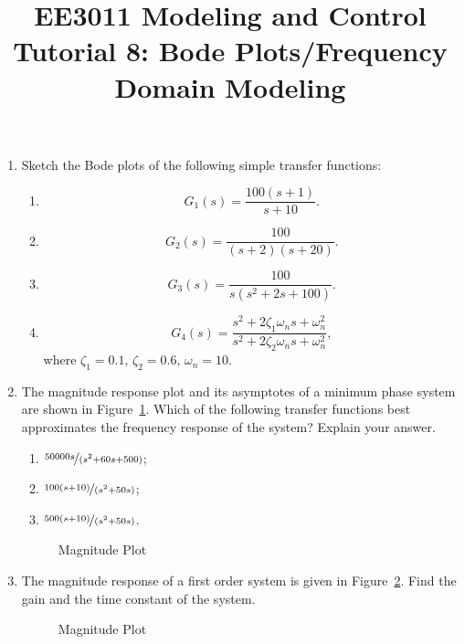 \documentclass{article}
\title{EE3011 Modeling and Control\\Tutorial 8: Bode Plots/Frequency Domain Modeling}
\date{}
\newcommand{\tikzdir}[1]{tikz/#1.tikz}
\newcommand{\inputtikz}[1]{}}
\begin{document}
 \maketitle

\begin{enumerate}
\item Sketch the Bode plots of the following simple transfer functions:
  \begin{enumerate}
  \item  \[G_1(s)=\frac{100(s+1)}{s+10}.\]
  \item  \[G_2(s)=\frac{100}{(s+2)(s+20)}.\]
  \item  \[G_3(s) = \frac{100}{s(s^2+2s+100)}.\]
  \item  \[G_4(s) = \frac{s^2+2\zeta_1\omega_ns+\omega_n^2}{s^2+2\zeta_2\omega_ns+\omega_n^2},\] where $\zeta_1 = 0.1,\,\zeta_2 = 0.6,\,\omega_n = 10$. 
  \end{enumerate}
\item The magnitude response plot and its asymptotes of a minimum phase system are shown in Figure~\ref{fig:2}. Which of the following transfer functions best approximates the frequency response of the system? Explain your answer.
\begin{enumerate}
\item $\nicefrac{50000s}{(s^2+60s+500)}$;
\item $\nicefrac{100(s+10)}{(s^2+50s)}$;
\item $\nicefrac{500(s+10)}{(s^2+50s)}$.
\end{enumerate}

  \begin{figure}[ht]
    \centering
    \inputtikz{Tut82}
    \caption{Magnitude Plot\label{fig:2}}
  \end{figure}
  \newpage
\item The magnitude response of a first order system is given in Figure~\ref{fig:3}. Find the gain and the time constant of the system.

  \begin{figure}[ht]
    \centering
    \inputtikz{Tut83}
    \caption{Magnitude Plot\label{fig:3}}
  \end{figure}
\end{enumerate}
\newpage
\end{document}

